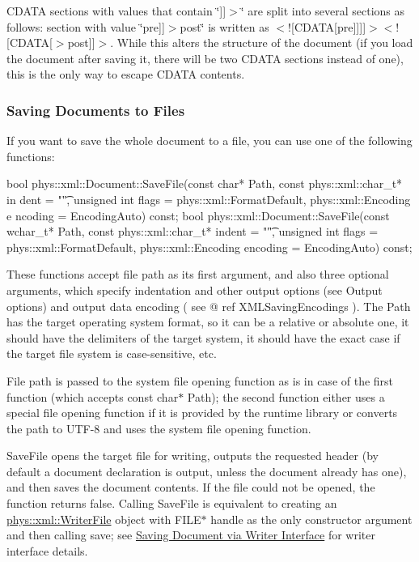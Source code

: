  CDATA sections with values that contain \char`\"{}\mbox{]}\mbox{]}$>$\char`\"{} are split into several sections as follows: section with value \char`\"{}pre\mbox{]}\mbox{]}$>$post\char`\"{} is written as $<$!\mbox{[}CDATA\mbox{[}pre\mbox{]}\mbox{]}\mbox{]}\mbox{]}$>$$<$!\mbox{[}CDATA\mbox{[}$>$post\mbox{]}\mbox{]}$>$. While this alters the structure of the document (if you load the document after saving it, there will be two CDATA sections instead of one), this is the only way to escape CDATA contents. \hypertarget{XMLManual_XMLSavingFile}{}\subsubsection{Saving Documents to Files}\label{XMLManual_XMLSavingFile}
If you want to save the whole document to a file, you can use one of the following functions: 
\begin{DoxyCode}
 bool phys::xml::Document::SaveFile(const char* Path, const phys::xml::char_t* in
      dent = "\t", unsigned int flags = phys::xml::FormatDefault, phys::xml::Encoding e
      ncoding = EncodingAuto) const;
 bool phys::xml::Document::SaveFile(const wchar_t* Path, const phys::xml::char_t*
       indent = "\t", unsigned int flags = phys::xml::FormatDefault, 
      phys::xml::Encoding encoding = EncodingAuto) const;
\end{DoxyCode}
 These functions accept file path as its first argument, and also three optional arguments, which specify indentation and other output options (see Output options) and output data encoding ( see @ ref XMLSavingEncodings ). The Path has the target operating system format, so it can be a relative or absolute one, it should have the delimiters of the target system, it should have the exact case if the target file system is case-\/sensitive, etc. \par
 \par
 File path is passed to the system file opening function as is in case of the first function (which accepts const char$\ast$ Path); the second function either uses a special file opening function if it is provided by the runtime library or converts the path to UTF-\/8 and uses the system file opening function. \par
 \par
 SaveFile opens the target file for writing, outputs the requested header (by default a document declaration is output, unless the document already has one), and then saves the document contents. If the file could not be opened, the function returns false. Calling SaveFile is equivalent to creating an \hyperlink{classphys_1_1xml_1_1WriterFile}{phys::xml::WriterFile} object with FILE$\ast$ handle as the only constructor argument and then calling save; see \hyperlink{XMLManual_XMLSavingWriter}{Saving Document via Writer Interface} for writer interface details. \par
$$
